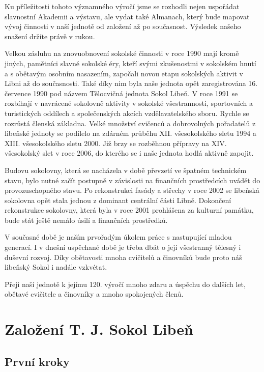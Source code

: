 Ku příležitosti tohoto významného výročí jsme se rozhodli nejen
uspořádat slavnostní Akademii a výstavu, ale vydat také Almanach, který
bude mapovat vývoj činnosti v naší jednotě od založení až po současnost.
Výsledek našeho snažení držíte právě v rukou.

Velkou zásluhu na znovuobnovení sokolské činnosti v roce 1990 mají kromě
jiných, pamětníci slavné sokolské éry, kteří svými zkušenostmi v
sokolském hnutí a s obětavým osobním nasazením, započali novou etapu
sokolských aktivit v Libni až do současnosti. Také díky nim byla naše
jednota opět zaregistrována 16. července 1990 pod názvem Tělocvičná
jednota Sokol Libeň. V roce 1991 se rozbíhají v navrácené sokolovně
aktivity v sokolské všestrannosti, sportovních a turistických oddílech a
společenských akcích vzdělavatelského sboru. Rychle se rozrůstá členská
základna. Velké množství cvičenců a dobrovolných pořadatelů z libeňské
jednoty se podílelo na zdárném průběhu XII. všesokolského sletu 1994 a
XIII. všesokolského sletu 2000. Již brzy se rozběhnou přípravy na XIV.
všesokolský slet v roce 2006, do kterého se i naše jednota hodlá aktivně
zapojit.

Budovu sokolovny, která se nacházela v době převzetí ve špatném
technickém stavu, bylo nutné začít postupně v závislosti na finančních
prostředcích uvádět do provozuschopného stavu. Po rekonstrukci fasády a
střechy v roce 2002 se libeňská sokolovna opět stala jednou z dominant
centrální části Libně. Dokončení rekonstrukce sokolovny, která byla v
roce 2001 prohlášena za kulturní památku, bude stát ještě nemálo úsilí a
finančních prostředků.

V současné době je naším prvořadým úkolem práce s nastupující mladou
generací. I v dnešní uspěchané době je třeba dbát o její všestranný
tělesný i duševní rozvoj. Díky obětavosti mnoha cvičitelů a činovníků
bude proto náš libeňský Sokol i nadále vzkvétat.

Přeji naší jednotě k jejímu 120. výročí mnoho zdaru a úspěchu do dalších
let, obětavé cvičitele a činovníky a mnoho spokojených členů.

\section{Založení T. J. Sokol
Libeň}\label{zaloux17eenuxed-t.-j.-sokol-libeux148}

\subsection{První kroky}\label{prvnuxed-kroky}

